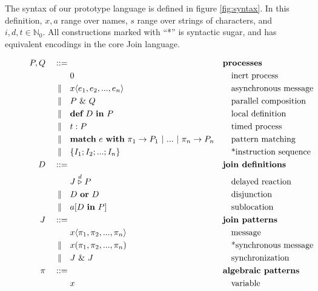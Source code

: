 The syntax of our prototype language is defined in figure \ref{fig:syntax}. In
this definition, $x,a$ range over names, $s$ range over strings of characters,
and $i,d,t \in \mathbb{N}_0$. All constructions marked with ``*'' is syntactic
sugar, and has equivalent encodings in the core Join language.

\begin{figure}
\newcommand{\alt}{\mid\kern-1pt\mid}
\begin{align*}
P,Q\quad::={}&             && \textbf{processes} \\
          & 0              && \quad\textrm{inert process} \\
 \alt\quad& x\langle e_1, e_2, ..., e_n \rangle
                           && \quad\textrm{asynchronous message} \\
 \alt\quad& P~\&~Q         && \quad\textrm{parallel composition} \\
 \alt\quad& \textbf{def}~D~\textbf{in}~P
                           && \quad\textrm{local definition} \\
 \alt\quad& t : P          && \quad\textrm{timed process} \\
 \alt\quad& \textbf{match}~e~\textbf{with}~\pi_1
               \rightarrow P_1 ~|~ ... ~|~ \pi_n \rightarrow P_n
                           && \quad\textrm{pattern matching} \\
 \alt\quad& \{ I_1; I_2; ...; I_n \}
                           && \quad\textrm{*instruction sequence} \\
D\quad ::={}&              && \textbf{join definitions} \\
         & J \stackrel{d}{\triangleright} P
                           && \quad\textrm{delayed reaction} \\
\alt\quad& D~\textbf{or}~D && \quad\textrm{disjunction} \\
\alt\quad& a[D~\textbf{in}~P] && \quad\textrm{sublocation} \\
J\quad ::={}&              && \textbf{join patterns}\\
         & x\langle \pi_1, \pi_2, ..., \pi_n \rangle
                           && \quad\textrm{message} \\
\alt\quad& x(\pi_1, \pi_2, ..., \pi_n)
                           && \quad\textrm{*synchronous message} \\
\alt\quad& J~\&~J          && \quad\textrm{synchronization} \\
\pi\quad ::={}&            && \textbf{algebraic patterns} \\
         & x               && \quad\textrm{variable} \\

\end{align*}
\end{figure}

